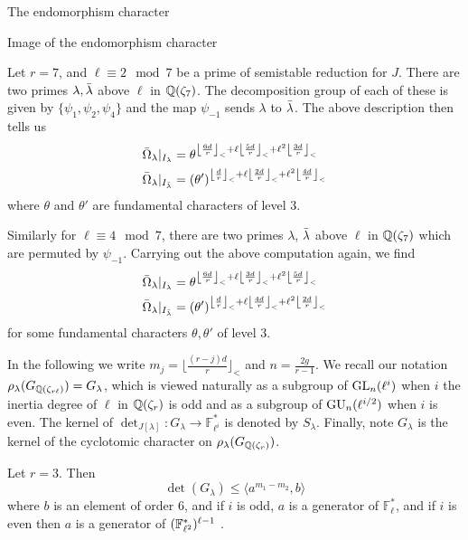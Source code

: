 \documentclass[11pt,a4paper]{article}
\newcommand{\Fl}{\mathbb{F}_\ell}
\newcommand{\Fli}{\mathbb{F}_{\ell^i}}
\newcommand{\Qr}{{\QQ(\zeta_r)}}
\newcommand{\GQr}{G_{\QQ(\zeta_{r})}}
\newcommand{\GQrl}{G_{\QQ(\zeta_{r\ell})}}
\newcommand{\Glam}{G_{\lambda}}
\newcommand{\Slam}{S_{\lambda}}
\begin{document}
\begin{section}{The endomorphism character}
\begin{subsection}{Image of the endomorphism character}
\begin{example}
Let $r=7$, and $\ell \equiv 2 \mod{7}$ be a prime of semistable reduction for $J$. There are two primes $\lambda, \Bar{\lambda}$ above $\ell$ in $\mathbb{Q}(\zeta_7)$. The decomposition group of each of these is given by $\{\psi_{1},\psi_{2},\psi_{4}\}$ and the map $\psi_{-1}$ sends $\lambda$ to $\Bar{\lambda}$. The above description then tells us
\begin{align*}
    \Bar{\Omega}_\lambda|_{I_\lambda} &= \theta^{\left\lfloor \frac{6d}{r}\right\rfloor_< + \ell \left\lfloor \frac{5d}{r}\right\rfloor_<  + \ell^2\left\lfloor \frac{3d}{r}\right\rfloor_<}\\
    \Bar{\Omega}_\lambda|_{I_{\Bar{\lambda}}} &= (\theta')^{\left\lfloor \frac{d}{r}\right\rfloor_< + \ell \left\lfloor \frac{2d}{r}\right\rfloor_<  + \ell^2 \left\lfloor \frac{4d}{r}\right\rfloor_<}
\end{align*}
where $\theta$ and $\theta'$ are fundamental characters of level $3$.

Similarly for $\ell \equiv 4 \mod{7}$, there are two primes $\lambda$, $\Bar{\lambda}$ above $\ell$ in $\mathbb{Q}(\zeta_7)$ which are permuted by $\psi_{-1}$. Carrying out the above computation again, we find
\begin{align*}
    \Bar{\Omega}_\lambda|_{I_\lambda} &= \theta^{\left\lfloor \frac{6d}{r}\right\rfloor_< + \ell \left\lfloor \frac{3d}{r}\right\rfloor_<  + \ell^2 \left\lfloor \frac{5d}{r}\right\rfloor_< }\\
    \Bar{\Omega}_\lambda|_{I_{\Bar{\lambda}}} &= (\theta')^{\left\lfloor \frac{d}{r}\right\rfloor_< + \ell \left\lfloor \frac{4d}{r}\right\rfloor_<  + \ell^2 \left\lfloor \frac{2d}{r}\right\rfloor_< }
\end{align*}
for some fundamental characters $\theta, \theta'$ of level $3$.
\end{example}


In the following we write $m_j = \lfloor \frac{(r-j)d}{r} \rfloor_<$ and $n=\frac{2g}{r-1}$.
We recall our notation $\rho_\lambda(\GQrl)=\Glam$, which is viewed naturally as a subgroup of $\GL_n(\ell^i)$ when $i$ the inertia degree of $\ell$ in $\Qr$ is odd and as a subgroup of $\GU_n(\ell^{i/2})$ when $i$ is even. The kernel of $\det_{J[\lambda]}\colon\Glam \rightarrow \Fli^*$ is denoted by $\Slam$.
Finally, note $\Glam$ is the kernel of the cyclotomic character on $\rho_\lambda(\GQr)$. 

\begin{lemma}
\label{Lem_upper_bound_on_Glam}
Let $r =3$. Then
\[\det(\Glam) \leq \langle a^{m_1-m_2},b\rangle 
\] where $b$ is an element of order $6$, and if $i$ is odd, $a$ is a generator of $\Fl^*$, and if $i$ is even then $a$ is a generator of $(\mathbb{F}_{\ell^2}^*)^{\ell-1}$ .
\end{lemma}


\end{subsection}
\end{section}
\end{document}

